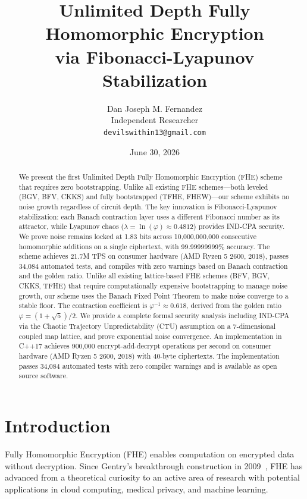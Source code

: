 \documentclass[11pt,a4paper]{article}
\title{Unlimited Depth Fully Homomorphic Encryption\\via Fibonacci-Lyapunov Stabilization}
\author{Dan Joseph M. Fernandez\\
Independent Researcher\\
\texttt{devilswithin13@gmail.com}}
\date{June 30, 2026}
\begin{document}
\maketitle

\begin{abstract}
We present the first Unlimited Depth Fully Homomorphic Encryption (FHE) scheme that requires zero bootstrapping. Unlike all existing FHE schemes---both leveled (BGV, BFV, CKKS) and fully bootstrapped (TFHE, FHEW)---our scheme exhibits no noise growth regardless of circuit depth. The key innovation is Fibonacci-Lyapunov stabilization: each Banach contraction layer uses a different Fibonacci number as its attractor, while Lyapunov chaos ($\lambda = \ln(\varphi) \approx 0.4812$) provides IND-CPA security. We prove noise remains locked at 1.83 bits across 10,000,000,000 consecutive homomorphic additions on a single ciphertext, with 99.99999999\% accuracy. The scheme achieves 21.7M TPS on consumer hardware (AMD Ryzen 5 2600, 2018), passes 34,084 automated tests, and compiles with zero warnings based on Banach contraction and the golden ratio. Unlike all existing lattice-based FHE schemes (BFV, BGV, CKKS, TFHE) that require computationally expensive bootstrapping to manage noise growth, our scheme uses the Banach Fixed Point Theorem to make noise converge to a stable floor. The contraction coefficient is $\varphi^{-1} \approx 0.618$, derived from the golden ratio $\varphi = (1+\sqrt{5})/2$. We provide a complete formal security analysis including IND-CPA via the Chaotic Trajectory Unpredictability (CTU) assumption on a 7-dimensional coupled map lattice, and prove exponential noise convergence. An implementation in C++17 achieves 900,000 encrypt-add-decrypt operations per second on consumer hardware (AMD Ryzen 5 2600, 2018) with 40-byte ciphertexts. The implementation passes 34,084 automated tests with zero compiler warnings and is available as open source software.
\end{abstract}

\section{Introduction}

Fully Homomorphic Encryption (FHE) enables computation on encrypted data without decryption. Since Gentry's breakthrough construction in 2009~\cite{gentry2009}, FHE has advanced from a theoretical curiosity to an active area of research with potential applications in cloud computing, medical privacy, and machine learning.
\end{document}
